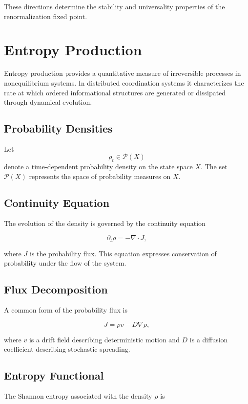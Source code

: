 \documentclass[12pt]{article}
\begin{document}
These directions determine the stability and universality properties of the renormalization fixed point.

\section{Entropy Production}

Entropy production provides a quantitative measure of irreversible processes in nonequilibrium systems. In distributed coordination systems it characterizes the rate at which ordered informational structures are generated or dissipated through dynamical evolution.

\subsection{Probability Densities}

Let
\[
\rho_t \in \mathcal{P}(X)
\]
denote a time-dependent probability density on the state space $X$. The set $\mathcal{P}(X)$ represents the space of probability measures on $X$.

\subsection{Continuity Equation}

The evolution of the density is governed by the continuity equation

\[
\partial_t \rho = -\nabla \cdot J,
\]

where $J$ is the probability flux. This equation expresses conservation of probability under the flow of the system.

\subsection{Flux Decomposition}

A common form of the probability flux is

\[
J = \rho v - D \nabla \rho,
\]

where $v$ is a drift field describing deterministic motion and $D$ is a diffusion coefficient describing stochastic spreading.

\subsection{Entropy Functional}

The Shannon entropy associated with the density $\rho$ is
\end{document}
